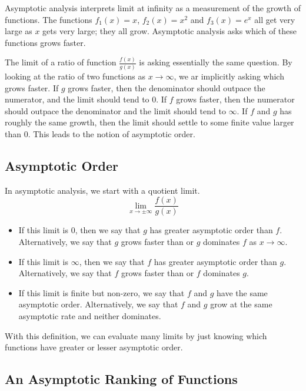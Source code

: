 \documentclass[fleqn]{report}
\begin{document}
Asymptotic analysis interprets limit at infinity
as a measurement of the growth of functions. The functions
$f_1(x) = x$, $f_2(x) = x^2$ and $f_3(x) = e^x$ all get very large as
$x$ gets very large; they all grow. Asymptotic analysis asks
which of these functions grows faster. 

The limit of a ratio of function $\frac{f(x)}{g(x)}$ is asking
essentially the same question. By looking at the ratio of two
functions as $x \rightarrow \infty$, we ar implicitly asking
which grows faster. If $g$ grows faster, then the denominator
should outpace the numerator, and the limit should tend to
$0$. If $f$ grows faster, then the numerator should outpace
the denominator and the limit should tend to $\infty$. If $f$
and $g$ has roughly the same growth, then the limit should
settle to some finite value larger than $0$. This leads to
the notion of asymptotic order.

\subsection{Asymptotic Order}
\label{asymptotic-order}

In asymptotic analysis, we start with a quotient limit.
\begin{equation*}
\lim_{x \rightarrow \pm \infty} \frac{f(x)}{g(x)}
\end{equation*}
\begin{itemize}
\item If this limit is $0$, then we say that $g$ has greater
asymptotic order than $f$. Alternatively, we say that $g$ grows
faster than or $g$ dominates $f$ as $x \rightarrow \infty$. 
\item If this limit is $\infty$, then we say that $f$ has
greater asymptotic order than $g$. Alternatively, we say that
$f$ grows faster than or $f$ dominates $g$.
\item If this limit is finite but non-zero, we say that $f$ and
$g$ have the same asymptotic order. Alternatively, we say that
$f$ and $g$ grow at the same asymptotic rate and neither
dominates.
\end{itemize}
With this definition, we can evaluate many limits by just
knowing which functions have greater or lesser asymptotic
order.

\subsection{An Asymptotic Ranking of Functions}
\label{asymptotic-ranking}
\end{document}
